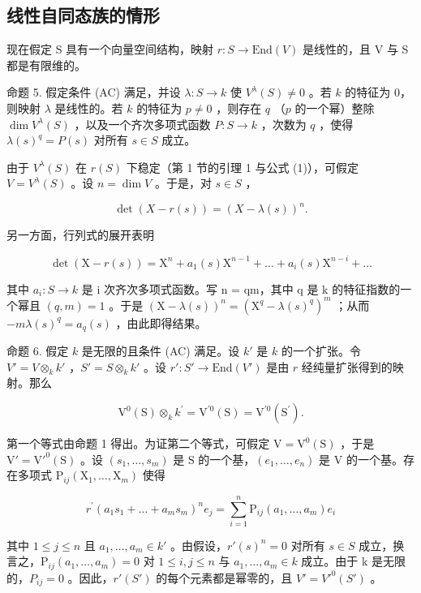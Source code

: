 \subsection{线性自同态族的情形}

现在假定 S 具有一个向量空间结构，映射 \(r : S \to \text{End}(V)\) 是线性的，且 V 与 S 都是有限维的。

命题 5. 假定条件 (AC) 满足，并设 \(\lambda : S \to k\) 使 \(V^{\lambda}(S) \neq 0\) 。若 \(k\) 的特征为 0，则映射 \(\lambda\) 是线性的。若 \(k\) 的特征为 \(p \neq 0\) ，则存在 \(q\) （\(p\) 的一个幂）整除 \(\dim V^{\lambda}(S)\) ，以及一个齐次多项式函数 \(P : S \to k\) ，次数为 \(q\) ，使得 \(\lambda(s)^{q} = P(s)\) 对所有 \(s \in S\) 成立。

由于 \(V^{\lambda}(S)\) 在 \(r(S)\) 下稳定（第 1 节的引理 1 与公式 (1)），可假定 \(V = V^{\lambda}(S)\) 。设 \(n = \dim V\) 。于是，对 \(s \in S\) ，

\[
\det (X - r (s)) = (X - \lambda (s)) ^ {n}.
\]

另一方面，行列式的展开表明

\[
\det (\mathrm{X} - r (s)) = \mathrm{X} ^ {n} + a _ {1} (s) \mathrm{X} ^ {n - 1} + \dots + a _ {i} (s) \mathrm{X} ^ {n - i} + \dots
\]

其中 \(a_{i}: S \to k\) 是 i 次齐次多项式函数。写 n = qm，其中 q 是 k 的特征指数的一个幂且 \((q, m) = 1\) 。于是 \((\mathrm{X} - \lambda(s))^{n} = (\mathrm{X}^{q} - \lambda(s)^{q})^{m}\) ；从而 \(-m\lambda(s)^{q} = a_{q}(s)\) ，由此即得结果。

命题 6. 假定 \(k\) 是无限的且条件 (AC) 满足。设 \(k'\) 是 \(k\) 的一个扩张。令 \(V' = V \otimes_k k'\) ，\(S' = S \otimes_k k'\) 。设 \(r': S' \to \text{End}(V')\) 是由 \(r\) 经纯量扩张得到的映射。那么

\[
\mathrm{V} ^ {0} (\mathrm{S}) \otimes_ {k} k ^ {\prime} = \mathrm{V} ^ {\prime 0} (\mathrm{S}) = \mathrm{V} ^ {\prime 0} (\mathrm{S} ^ {\prime}).
\]

第一个等式由命题 1 得出。为证第二个等式，可假定 \(\mathrm{V} = \mathrm{V}^0 (\mathrm{S})\) ，于是 \(\mathrm{V}' = \mathrm{V}'^{0}(\mathrm{S})\) 。设 \((s_1,\dots ,s_m)\) 是 \(\mathrm{S}\) 的一个基，\((e_1,\dots ,e_n)\) 是 \(\mathrm{V}\) 的一个基。存在多项式 \(\mathrm{P}_{ij}(\mathrm{X}_1,\dots ,\mathrm{X}_m)\) 使得

\[
r ^ {\prime} (a _ {1} s _ {1} + \dots + a _ {m} s _ {m}) ^ {n} e _ {j} = \sum_ {i = 1} ^ {n} \mathrm{P} _ {i j} (a _ {1}, \ldots , a _ {m}) e _ {i}
\]

其中 \(1 \leq j \leq n\) 且 \(a_{1}, \ldots, a_{m} \in k'\) 。由假设，\(r'(s)^{n} = 0\) 对所有 \(s \in S\) 成立，换言之，\(\mathrm{P}_{ij}(a_{1}, \ldots, a_{m}) = 0\) 对 \(1 \leq i, j \leq n\) 与 \(a_{1}, \ldots, a_{m} \in k\) 成立。由于 k 是无限的，\(P_{ij} = 0\) 。因此，\(r'(S')\) 的每个元素都是幂零的，且 \(V' = V'^{0}(S')\) 。

